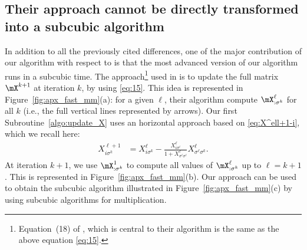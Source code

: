 \subsection{Their approach cannot be directly transformed into a subcubic algorithm}
\label{apx:eq_15}

In addition to all the previously cited differences, one of the major contribution of our algorithm with respect to \cite{akbarzadeh2020conditions,nino2020fast} is that the most advanced version of our algorithm runs in a subcubic time. The approach\footnote{Equation~(18) of \cite{akbarzadeh2020conditions}, which is central to their algorithm is the same as the above equation \eqref{eq:15}.} used  in \cite{akbarzadeh2020conditions,nino2020fast} is to update the full matrix $\mX^{k+1}$ at iteration $k$, by using \eqref{eq:15}.  This idea is represented in Figure~\ref{fig:apx_fast_mm}(a): for a given $\ell$, their algorithm compute $\mX^\ell_{:\sigma^k}$ for all $k$ (i.e., the full vertical lines represented by arrows).  Our first Subroutine~\ref{algo:update_X} uses an horizontal approach based on \eqref{eq:X^ell+1-i}, which we recall here:
\begin{align*}
    X^{\ell+1}_{i\sigma^k} &= X^{\ell}_{i\sigma^k} - \frac{X^{\ell}_{i\sigma^\ell}}{1+X^{\ell}_{{\sigma^\ell\sigma^\ell}}} X^{\ell}_{{\sigma^\ell} \sigma^k}.
\end{align*}
At iteration $k+1$, we use $\mX^{1}_{: \sigma^k}$ to compute all values of $\mX^\ell_{:\sigma^k}$ up to $\ell=k+1$.  This is represented in Figure~\ref{fig:apx_fast_mm}(b).  Our approach can be used to obtain the subcubic algorithm illustrated in Figure~\ref{fig:apx_fast_mm}(c) by using subcubic algorithms for multiplication.


